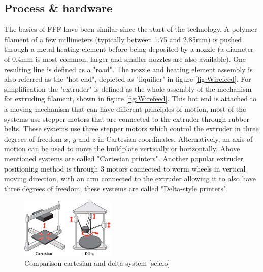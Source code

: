 \subsection{Process \& hardware}
    \label{Hardware}
The basics of FFF have been  similar since the start of the technology. A polymer filament of a few millimeters (typically between 1.75 and 2.85mm) is pushed through  a metal heating element before being deposited by a nozzle (a diameter of 0.4mm is most common, larger and smaller nozzles are also available). One resulting line is defined as a "road". The nozzle and heating element assembly is also referred as the "hot end", depicted as "liquifier" in figure \ref{fig:Wirefeed}. For simplification the "extruder" is defined as the whole assembly of the mechanism for extruding filament, shown in figure \ref{fig:Wirefeed}. This hot end is attached to a moving mechanism that can have different principles of motion, most of the systems use stepper motors that are connected to the extruder through rubber belts. These systems use three stepper motors which control the extruder in three degrees of freedom $x$, $y$ and $z$ in Cartesian coordinates. Alternatively, an axis of motion can be used to move the buildplate vertically or horizontally. Above mentioned systems are called "Cartesian printers". Another popular extruder positioning method is through 3 motors connected to worm wheels in vertical moving direction, with an arm connected to the extruder allowing it to also have three degrees of freedom, these systems are called "Delta-style printers". 


\begin{figure}[H]
    \centering
    \includegraphics[width=0.40\textwidth]{chapter_2/figures/cartesiandelta.jpg}
    \caption{Comparison cartesian and delta system [scielo]}
    \label{fig:cartesiandelta}
\end{figure}

